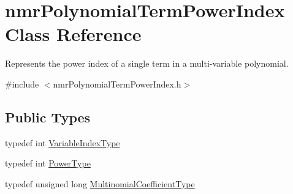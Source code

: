 \hypertarget{classnmr_polynomial_term_power_index}{\section{nmr\-Polynomial\-Term\-Power\-Index Class Reference}
\label{classnmr_polynomial_term_power_index}
}


Represents the power index of a single term in a multi-\/variable polynomial.  




{\ttfamily \#include $<$nmr\-Polynomial\-Term\-Power\-Index.\-h$>$}

\subsection*{Public Types}
\begin{DoxyCompactItemize}
\item 
typedef int \hyperlink{classnmr_polynomial_term_power_index_ac982d5f82c3a95968e92d54c92cbc3e0}{Variable\-Index\-Type}
\item 
typedef int \hyperlink{classnmr_polynomial_term_power_index_a2eec01c3a2c3f56f47982ceffd8e36ed}{Power\-Type}
\item 
typedef unsigned long \hyperlink{classnmr_polynomial_term_power_index_a09f482da776cfb829e26ad1fb381ab94}{Multinomial\-Coefficient\-Type}
\end{DoxyCompactItemize}
